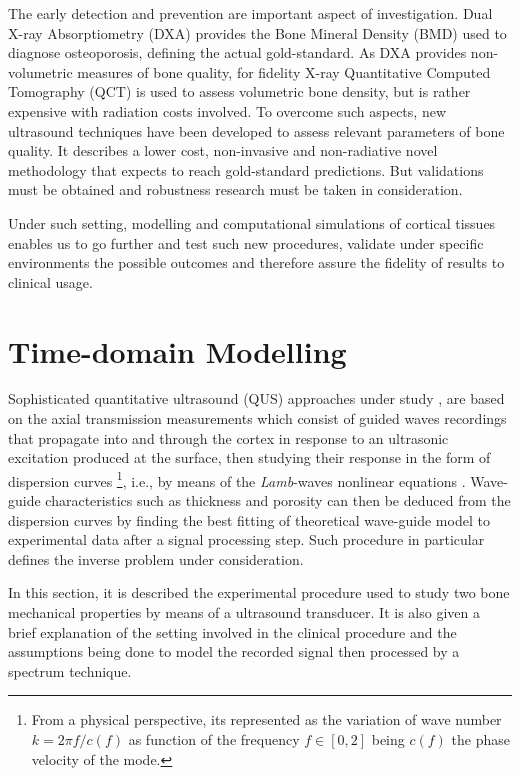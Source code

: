 The early detection and prevention are important aspect of investigation. Dual X-ray Absorptiometry (DXA) provides the Bone Mineral Density (BMD) used to diagnose osteoporosis, defining the actual gold-standard.
As DXA provides non-volumetric measures of bone quality, for fidelity X-ray Quantitative Computed Tomography (QCT) is used to assess volumetric bone density, but is rather expensive with radiation costs involved. To overcome such aspects, new ultrasound techniques have been developed to assess relevant parameters of bone quality. It describes a lower cost, non-invasive and non-radiative novel methodology that expects to reach gold-standard predictions. But validations must be obtained and robustness research must be taken in consideration.

Under such setting, modelling and computational simulations of cortical tissues enables us to go further and test such new  procedures, validate under specific environments the possible outcomes and therefore assure the fidelity of results to clinical usage.


\section{Time-domain Modelling}

Sophisticated quantitative ultrasound (QUS) approaches under study \cite{Foiret2014} \cite{Minonzio2018}, are based on the axial transmission measurements which consist of guided waves recordings that propagate into and through the cortex in response to an ultrasonic excitation produced at the surface, then studying their response in the form of dispersion curves \footnote{From a physical perspective, its represented as the variation of wave number $k = 2 \pi f/c(f)$ as function of the frequency $f \in [0, 2]$ being $c(f)$ the phase velocity of the mode.}, i.e., by means of the \textit{Lamb}-waves nonlinear equations \cite{Rhee2007}.
Wave-guide characteristics such as thickness and porosity can then be deduced from the dispersion curves by finding the best fitting of theoretical wave-guide model to experimental data after a signal processing step. Such procedure in particular defines the inverse problem under consideration.

In this section, it is described the experimental procedure used to study two bone mechanical properties by means of a ultrasound transducer.
It is also given a brief explanation of the setting involved in the clinical procedure and the assumptions being done to model the recorded signal then processed by a spectrum technique. 

